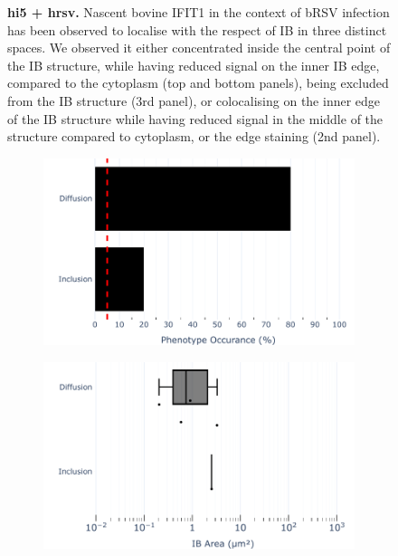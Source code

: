 \begin{figure}
\begin{subfigure}{1\textwidth}
    \end{subfigure}
    \caption[hi5 + hrsv]{\textbf{hi5 + hrsv.} Nascent bovine IFIT1 in the context of bRSV infection has been observed to localise with the respect of IB in three distinct spaces. We observed it either concentrated inside the central point of the IB structure, while having reduced signal on the inner IB edge, compared to the cytoplasm (top and bottom panels), being excluded from the IB structure (3rd panel), or colocalising on the inner edge of the IB structure while having reduced signal in the middle of the structure compared to cytoplasm, or the edge staining (2nd panel).}
    \label{fig:hi5 + hrsv}
\end{figure}

\begin{figure}
    \begin{subfigure}{0.5\textwidth}
        \caption{}
        \includegraphics[width=1\linewidth]{09. Chapter 4/Figs/04. Overexpression/03. IFIT5/04. bar_i5_brsv.pdf} 
    \end{subfigure}
    \begin{subfigure}{0.5\textwidth}
        \caption{}
        \includegraphics[width=1\linewidth]{09. Chapter 4/Figs/04. Overexpression/03. IFIT5/05. box_i5_brsv.pdf}

\end{subfigure}
\end{figure}

